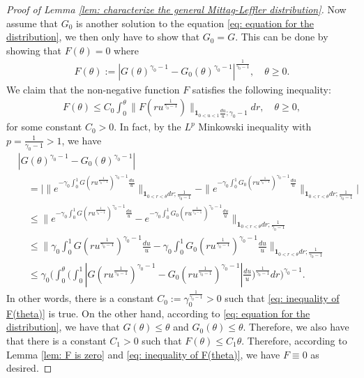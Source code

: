\documentclass[UTF8]{pkuthss}
\theoremstyle{plain}
\theoremstyle{definition}
\numberwithin{equation}{section}
\begin{document}
\begin{proof}[Proof of Lemma \ref{lem: characterize the general Mittag-Leffler distribution}]
	Now assume that $G_0$ is another solution to the equation \eqref{eq: equation for the distribution}, we then only have to show that $G_0 = G$.
	This can be done by showing that $F(\theta) = 0$ where
\begin{align}
	F(\theta)
	:= |G(\theta)^{\gamma_0 - 1} - G_0(\theta)^{\gamma_0 - 1}|^{\frac{1}{\gamma_0 - 1}},
	\quad \theta \geq 0.
\end{align}
	We claim that the non-negative function $F$ satisfies
	the following inequality:
\begin{align}\label{eq: inequality of F(theta)}
	F(\theta)
	\leq C_0 \int_0^\theta \|  F(ru^{\frac{1}{\gamma_0 - 1}})\|_{\mathbf 1_{0<u<1}\frac{du}{u}; \gamma_0 - 1} dr, \quad \theta \geq 0,
\end{align}
	for some constant $C_0 > 0$.
	In fact, by the $L^p$ Minkowski inequality with $p = \frac{1}{\gamma_0 - 1} > 1$, we have
\begin{align}
	&|G(\theta)^{\gamma_0 - 1} - G_0(\theta)^{\gamma_0 - 1}|
	\\&\quad = \Big| \|e^{-\gamma_0\int_0^1 G(ru^{\frac{1}{\gamma_0 - 1}})^{\gamma_0 - 1} \frac{du}{u}} \|_{\mathbf 1_{0<r<\theta}dr;\frac{1}{\gamma_0 - 1}} - \|e^{-\gamma_0\int_0^1 G_0(ru^{\frac{1}{\gamma_0 - 1}})^{\gamma_0 - 1} \frac{du}{u}} \|_{\mathbf 1_{0<r<\theta}dr;\frac{1}{\gamma_0 - 1}} \Big|
	\\ & \quad \leq \| e^{-\gamma_0\int_0^1 G(ru^{\frac{1}{\gamma_0 - 1}})^{\gamma_0 - 1} \frac{du}{u}} - e^{-\gamma_0\int_0^1 G_0(ru^{\frac{1}{\gamma_0 - 1}})^{\gamma_0 - 1} \frac{du}{u}} \|_{\mathbf 1_{0<r<\theta}dr;\frac{1}{\gamma_0 - 1}}
	\\ & \quad \leq \Big\| \gamma_0\int_0^1 G(ru^{\frac{1}{\gamma_0 - 1}})^{\gamma_0 - 1} \frac{du}{u} - \gamma_0\int_0^1 G_0(ru^{\frac{1}{\gamma_0 - 1}})^{\gamma_0 - 1} \frac{du}{u} \Big\|_{\mathbf 1_{0<r<\theta}dr;\frac{1}{\gamma_0 - 1}}
	\\ & \quad \leq \gamma_0 \Bigg( \int_0^\theta \Big( \int_0^1 |G(ru^{\frac{1}{\gamma_0 - 1}})^{\gamma_0 - 1} - G_0(ru^{\frac{1}{\gamma_0 - 1}})^{\gamma_0 - 1}| \frac{du}{u} \Big)^{\frac{1}{\gamma_0 - 1}} dr \Bigg)^{\gamma_0 - 1}.
\end{align}
	In other words, there is a constant $C_0:= \gamma_0^{\frac{1}{\gamma_0 - 1}}>0$ such that \eqref{eq: inequality of F(theta)} is true.
	On the other hand, according to \eqref{eq: equation for the distribution}, we have that $G(\theta) \leq \theta$ and $G_0(\theta) \leq \theta$.
	Therefore, we also have that there is a constant $C_1 > 0$ such that $F(\theta) \leq C_1 \theta$.
	Therefore, according to Lemma \ref{lem: F is zero} and \eqref{eq: inequality of F(theta)}, we have $F \equiv 0$ as desired.
\end{proof}
\end{document}
